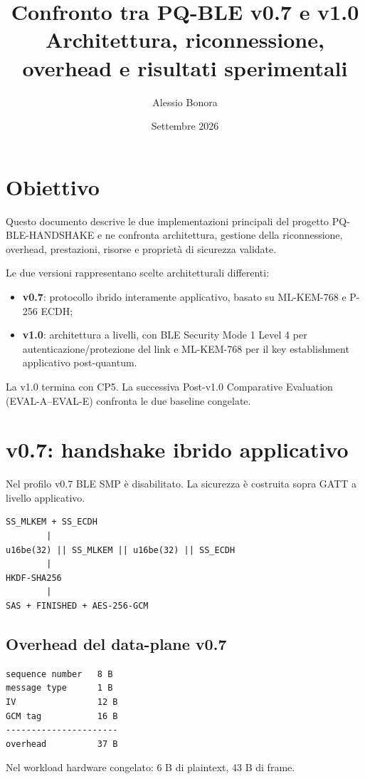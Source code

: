 \documentclass[11pt,a4paper]{article}
\title{Confronto tra PQ-BLE v0.7 e v1.0\\
\large Architettura, riconnessione, overhead e risultati sperimentali}
\author{Alessio Bonora}
\date{Settembre 2026}
\begin{document}
\maketitle
\tableofcontents
\newpage

\section{Obiettivo}
Questo documento descrive le due implementazioni principali del progetto
PQ-BLE-HANDSHAKE e ne confronta architettura, gestione della riconnessione,
overhead, prestazioni, risorse e proprietà di sicurezza validate.

Le due versioni rappresentano scelte architetturali differenti:
\begin{itemize}[nosep]
\item \textbf{v0.7}: protocollo ibrido interamente applicativo, basato su ML-KEM-768 e P-256 ECDH;
\item \textbf{v1.0}: architettura a livelli, con BLE Security Mode 1 Level 4 per autenticazione/protezione del link e ML-KEM-768 per il key establishment applicativo post-quantum.
\end{itemize}

La v1.0 termina con CP5. La successiva Post-v1.0 Comparative Evaluation
(EVAL-A--EVAL-E) confronta le due baseline congelate.

\section{v0.7: handshake ibrido applicativo}
Nel profilo v0.7 BLE SMP è disabilitato. La sicurezza è costruita sopra GATT a livello applicativo.

\begin{verbatim}
SS_MLKEM + SS_ECDH
        |
u16be(32) || SS_MLKEM || u16be(32) || SS_ECDH
        |
HKDF-SHA256
        |
SAS + FINISHED + AES-256-GCM
\end{verbatim}

\subsection{Overhead del data-plane v0.7}
\begin{verbatim}
sequence number   8 B
message type      1 B
IV                12 B
GCM tag           16 B
----------------------
overhead          37 B
\end{verbatim}

Nel workload hardware congelato: 6 B di plaintext, 43 B di frame.
\end{document}
